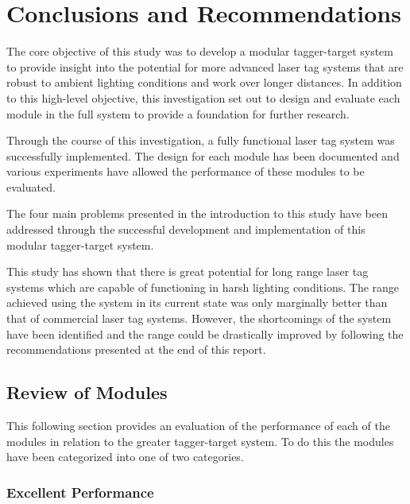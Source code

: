 \chapter{Conclusions and Recommendations}
\label{ch_conclusions}



The core objective of this study was to develop a modular tagger-target system to provide insight into the potential for more advanced laser tag systems that are robust to ambient lighting conditions and work over longer distances. In addition to this high-level objective, this investigation set out to design and evaluate each module in the full system to provide a foundation for further research.

Through the course of this investigation, a fully functional laser tag system was successfully implemented. The design for each module has been documented and various experiments have allowed the performance of these modules to be evaluated.

The four main problems presented in the introduction to this study have been addressed through the successful development and implementation of this modular tagger-target system. 

This study has shown that there is great potential for long range laser tag systems which are capable of functioning in harsh lighting conditions. The range achieved using the system in its current state was only marginally better than that of commercial laser tag systems. However, the shortcomings of the system have been identified and the range could be drastically improved by following the recommendations presented at the end of this report.

\section{Review of Modules}
This following section provides an evaluation of the performance of each of the modules in relation to the greater tagger-target system. To do this the modules have been categorized into one of two categories.




\subsection{Excellent Performance}

